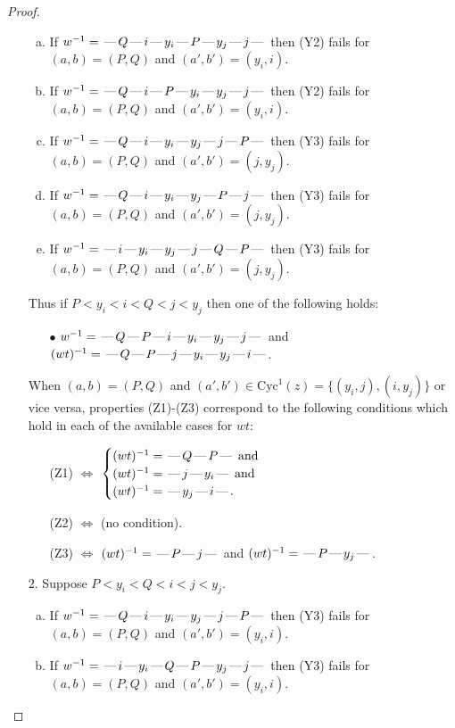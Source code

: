 \documentclass[10pt]{article}
\theoremstyle{definition}
\theoremstyle{definition}
\def\dash{\text{\hspace{0.5mm}---\hspace{0.5mm}}}
\def\Cyc{\mathrm{Cyc}}
\begin{document}
\begin{proof}
\begin{enumerate}
\begin{enumerate}[(a)]
\item If $w^{-1} = \dash Q\dash i\dash y_i\dash P\dash y_j\dash j\dash $ then (Y2) fails for $(a,b)=(P,Q)$ and $(a',b')=(y_i,i)$.
\item If $w^{-1} = \dash Q\dash i\dash P\dash y_i\dash y_j\dash j\dash $ then (Y2) fails for $(a,b)=(P,Q)$ and $(a',b')=(y_i,i)$.
\item If $w^{-1} = \dash Q\dash i\dash y_i\dash y_j\dash j\dash P\dash $ then (Y3) fails for $(a,b)=(P,Q)$ and $(a',b')=(j,y_j)$.
\item If $w^{-1} = \dash Q\dash i\dash y_i\dash y_j\dash P\dash j\dash $ then (Y3) fails for $(a,b)=(P,Q)$ and $(a',b')=(j,y_j)$.
\item If $w^{-1} = \dash i\dash y_i\dash y_j\dash j\dash Q\dash P\dash $ then (Y3) fails for $(a,b)=(P,Q)$ and $(a',b')=(j,y_j)$.
\end{enumerate}
Thus if $P < y_i < i < Q < j < y_j$ then one of the following holds:
\begin{enumerate}
\item[$\bullet$] $w^{-1} = \dash Q\dash P\dash i\dash y_i\dash y_j\dash j\dash $ and $(wt)^{-1} = \dash Q\dash P\dash j\dash y_i\dash y_j\dash i\dash $.
\end{enumerate}
When $(a,b)= (P,Q)$ and $(a',b')\in \Cyc^1(z)=\{(y_i,j),(i,y_j)\}$ or vice versa,
properties (Z1)-(Z3) correspond to the following conditions which
hold in each of the available cases for $wt$:
\begin{enumerate}
\item[](Z1) $\Leftrightarrow$ $\begin{cases}\text{$(wt)^{-1} = \dash Q \dash P \dash$}\text{ and }\\
\text{$(wt)^{-1} = \dash j \dash y_i \dash$}\text{ and }\\
\text{$(wt)^{-1} = \dash y_j \dash i \dash$}.\end{cases}$
\item[](Z2) $\Leftrightarrow$ (no condition).
\item[](Z3) $\Leftrightarrow$ $(wt)^{-1} = \dash P \dash j \dash$  and $(wt)^{-1} = \dash P \dash y_j \dash$.
\end{enumerate}
\item[$2$.] Suppose $P < y_i < Q < i < j < y_j$.
\begin{enumerate}[(a)]
\item If $w^{-1} = \dash Q\dash i\dash y_i\dash y_j\dash j\dash P\dash $ then (Y3) fails for $(a,b)=(P,Q)$ and $(a',b')=(y_i,i)$.
\item If $w^{-1} = \dash i\dash y_i\dash Q\dash P\dash y_j\dash j\dash $ then (Y3) fails for $(a,b)=(P,Q)$ and $(a',b')=(y_i,i)$.

\end{enumerate}
\end{enumerate}
\end{proof}
\end{document}
